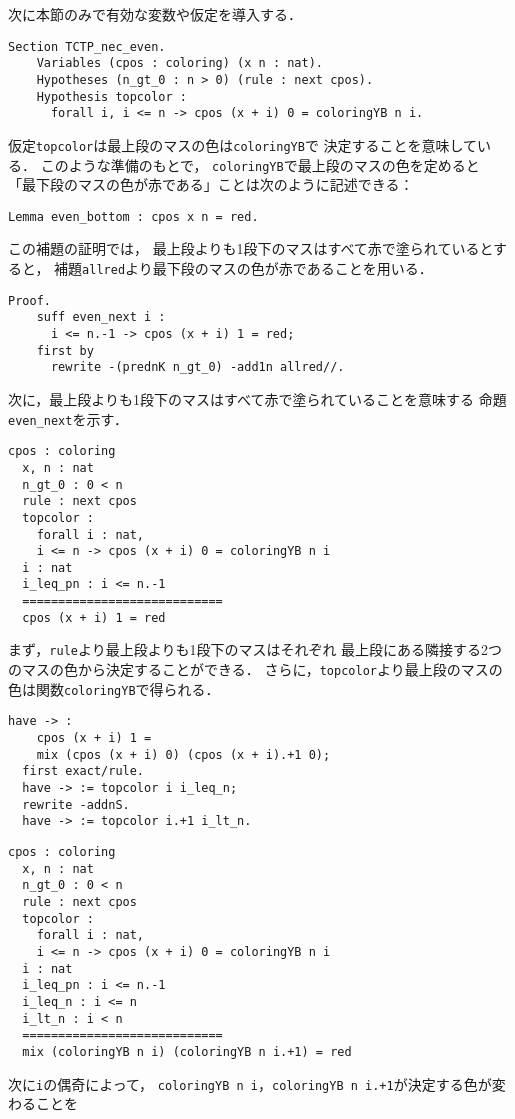 次に本節のみで有効な変数や仮定を導入する．
\begin{lstlisting}[language=Coq]
  Section TCTP_nec_even.
    Variables (cpos : coloring) (x n : nat).
    Hypotheses (n_gt_0 : n > 0) (rule : next cpos).
    Hypothesis topcolor :
      forall i, i <= n -> cpos (x + i) 0 = coloringYB n i.
\end{lstlisting}
仮定{\tt{topcolor}}は最上段のマスの色は{\tt{coloringYB}}で
決定することを意味している．
このような準備のもとで，
{\tt{coloringYB}}で最上段のマスの色を定めると
「最下段のマスの色が赤である」ことは次のように記述できる：
\begin{lstlisting}[language=Coq]
  Lemma even_bottom : cpos x n = red.
\end{lstlisting}
この補題の証明では，
最上段よりも1段下のマスはすべて赤で塗られているとすると，
補題{\tt{allred}}より最下段のマスの色が赤であることを用いる．
\begin{lstlisting}[language=Coq]
  Proof.
    suff even_next i :
      i <= n.-1 -> cpos (x + i) 1 = red;
    first by
      rewrite -(prednK n_gt_0) -add1n allred//.
\end{lstlisting}
次に，最上段よりも1段下のマスはすべて赤で塗られていることを意味する
命題{\tt{even\_next}}を示す．
\begin{lstlisting}[language=Coq]
  cpos : coloring
  x, n : nat
  n_gt_0 : 0 < n
  rule : next cpos
  topcolor :
    forall i : nat,
    i <= n -> cpos (x + i) 0 = coloringYB n i
  i : nat
  i_leq_pn : i <= n.-1
  ============================
  cpos (x + i) 1 = red
\end{lstlisting}
まず，{\tt{rule}}より最上段よりも1段下のマスはそれぞれ
最上段にある隣接する2つのマスの色から決定することができる．
さらに，{\tt{topcolor}}より最上段のマスの色は関数{\tt{coloringYB}}で得られる．
\begin{lstlisting}[language=Coq]
  have -> :
    cpos (x + i) 1 =
    mix (cpos (x + i) 0) (cpos (x + i).+1 0);
  first exact/rule.
  have -> := topcolor i i_leq_n;
  rewrite -addnS.
  have -> := topcolor i.+1 i_lt_n.
\end{lstlisting}
\begin{lstlisting}[language=Coq]
  cpos : coloring
  x, n : nat
  n_gt_0 : 0 < n
  rule : next cpos
  topcolor :
    forall i : nat,
    i <= n -> cpos (x + i) 0 = coloringYB n i
  i : nat
  i_leq_pn : i <= n.-1
  i_leq_n : i <= n
  i_lt_n : i < n
  ============================
  mix (coloringYB n i) (coloringYB n i.+1) = red
\end{lstlisting}
次に{\tt{i}}の偶奇によって，
{\tt{coloringYB n i}}，{\tt{coloringYB n i.+1}}が決定する色が変わることを
